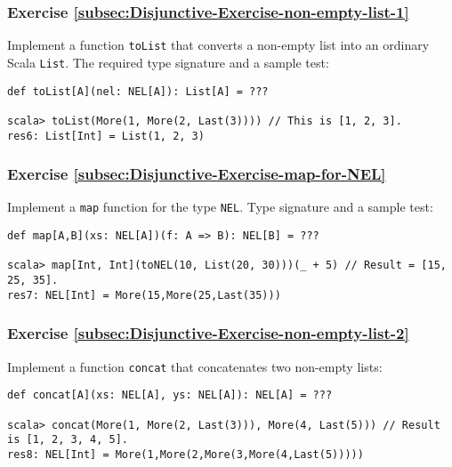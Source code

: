 \subsubsection{Exercise \label{subsec:Disjunctive-Exercise-non-empty-list-1}\ref{subsec:Disjunctive-Exercise-non-empty-list-1}}

Implement a function \lstinline!toList! that converts a non-empty
list into an ordinary Scala \lstinline!List!. The required type signature
and a sample test:
\begin{lstlisting}
def toList[A](nel: NEL[A]): List[A] = ???

scala> toList(More(1, More(2, Last(3)))) // This is [1, 2, 3].
res6: List[Int] = List(1, 2, 3)
\end{lstlisting}
\begin{comment}
Solution:

\begin{lstlisting}
def toList[A](nel: NEL[A]): List[A] = nel match {
  case Last(x)         => List(x)
  case More(x, tail)   => x :: toList(tail)
} // Not tail-recursive.
def toList[A](nel: NEL[A]): List[A] = foldLeft(nel)(Nil:List[A]) {
  (prev, x) =>  x :: prev
}.reverse // Tail-recursive, but performs two traversals.
\end{lstlisting}
\end{comment}


\subsubsection{Exercise \label{subsec:Disjunctive-Exercise-map-for-NEL}\ref{subsec:Disjunctive-Exercise-map-for-NEL}}

Implement a \lstinline!map! function for the type \lstinline!NEL!.
Type signature and a sample test:
\begin{lstlisting}
def map[A,B](xs: NEL[A])(f: A => B): NEL[B] = ???

scala> map[Int, Int](toNEL(10, List(20, 30)))(_ + 5) // Result = [15, 25, 35].
res7: NEL[Int] = More(15,More(25,Last(35)))
\end{lstlisting}


\subsubsection{Exercise \label{subsec:Disjunctive-Exercise-non-empty-list-2}\ref{subsec:Disjunctive-Exercise-non-empty-list-2}}

Implement a function \lstinline!concat! that concatenates two non-empty
lists:
\begin{lstlisting}
def concat[A](xs: NEL[A], ys: NEL[A]): NEL[A] = ???

scala> concat(More(1, More(2, Last(3))), More(4, Last(5))) // Result is [1, 2, 3, 4, 5].
res8: NEL[Int] = More(1,More(2,More(3,More(4,Last(5)))))
\end{lstlisting}


